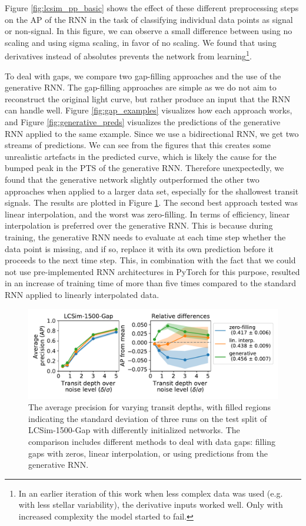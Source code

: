 Figure \ref{fig:lcsim_pp_basic} shows the effect of these different preprocessing steps on the AP of the RNN in the task of classifying individual data points as signal or non-signal. In this figure, we can observe a small difference between using no scaling and using sigma scaling, in favor of no scaling. We found that using derivatives instead of absolutes prevents the network from learning\footnote{In an earlier iteration of this work when less complex data was used (e.g. with less stellar variability), the derivative inputs worked well. Only with increased complexity the model started to fail.}.

To deal with gaps, we compare two gap-filling approaches and the use of the generative RNN. The gap-filling approaches are simple as we do not aim to reconstruct the original light curve, but rather produce an input that the RNN can handle well. Figure \ref{fig:gap_examples} visualizes how each approach works, and Figure \ref{fig:generative_preds} visualizes the predictions of the generative RNN applied to the same example. Since we use a bidirectional RNN, we get two streams of predictions. We can see from the figures that this creates some unrealistic artefacts in the predicted curve, which is likely the cause for the bumped peak in the PTS of the generative RNN. Therefore unexpectedly, we found that the generative network slightly outperformed the other two approaches when applied to a larger data set, especially for the shallowest transit signals. The results are plotted in Figure \ref{fig:lcsim_gaps}. The second best approach tested was linear interpolation, and the worst was zero-filling. In terms of efficiency, linear interpolation is preferred over the generative RNN. This is because during training, the generative RNN needs to evaluate at each time step whether the data point is missing, and if so, replace it with its own prediction before it proceeds to the next time step. This, in combination with the fact that we could not use pre-implemented RNN architectures in PyTorch for this purpose, resulted in an increase of training time of more than five times compared to the standard RNN applied to linearly interpolated data.

\begin{figure}
    \centering
    \includegraphics[width=0.7\linewidth]{Experiments/Figures/Preprocessing/lcsim1500_AP_pp-gaps.pdf}
    \caption{The average precision for varying transit depths, with filled regions indicating the standard deviation of three runs on the test split of LCSim-1500-Gap with differently initialized networks. The comparison includes different methods to deal with data gaps: filling gaps with zeros, linear interpolation, or using predictions from the generative RNN. }
    \label{fig:lcsim_gaps}
\end{figure}

